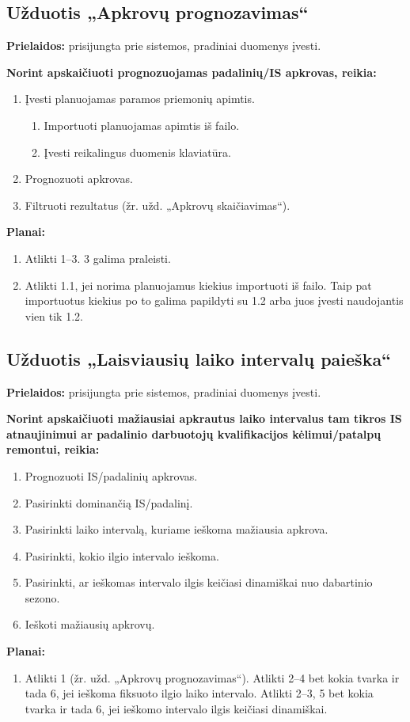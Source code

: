 \subsection{Užduotis „Apkrovų prognozavimas“}

\textbf{Prielaidos:} prisijungta prie sistemos, pradiniai duomenys įvesti.

\textbf{Norint apskaičiuoti prognozuojamas padalinių/IS apkrovas, reikia:}
\begin{enumerate}
  \item Įvesti planuojamas paramos priemonių apimtis.
  \begin{enumerate}
    \item Importuoti planuojamas apimtis iš failo.
    \item Įvesti reikalingus duomenis klaviatūra.
  \end{enumerate}
  
  \item Prognozuoti apkrovas.
  \item Filtruoti rezultatus (žr. užd. „Apkrovų skaičiavimas“).
\end{enumerate}

\vspace{1cm}
\textbf{Planai:}
\begin{enumerate}
  \item Atlikti 1–3. 3 galima praleisti.
  \item Atlikti 1.1, jei norima planuojamus kiekius importuoti iš failo. Taip pat importuotus
  kiekius po to galima papildyti su 1.2 arba juos įvesti naudojantis vien tik 1.2.
\end{enumerate}

\subsection{Užduotis „Laisviausių laiko intervalų paieška“}

\textbf{Prielaidos:} prisijungta prie sistemos, pradiniai duomenys įvesti.

\textbf{Norint apskaičiuoti mažiausiai apkrautus laiko intervalus tam tikros IS atnaujinimui ar
padalinio darbuotojų kvalifikacijos kėlimui/patalpų remontui, reikia:}
\begin{enumerate}
  \item Prognozuoti IS/padalinių apkrovas.
  \item Pasirinkti dominančią IS/padalinį.
  \item Pasirinkti laiko intervalą, kuriame ieškoma mažiausia apkrova.
  \item Pasirinkti, kokio ilgio intervalo ieškoma.
  \item Pasirinkti, ar ieškomas intervalo ilgis keičiasi dinamiškai nuo dabartinio sezono.
  \item Ieškoti mažiausių apkrovų.
\end{enumerate}

\vspace{1cm}
\textbf{Planai:}
\begin{enumerate}
  \item Atlikti 1 (žr. užd. „Apkrovų prognozavimas“). Atlikti 2–4 bet kokia tvarka ir tada 6,
  jei ieškoma fiksuoto ilgio laiko intervalo. Atlikti 2–3, 5 bet kokia tvarka ir tada 6, jei
  ieškomo intervalo ilgis keičiasi dinamiškai.
\end{enumerate}
